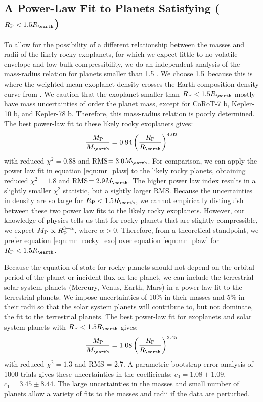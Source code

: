 \documentclass[iop]{emulateapj}
\begin{document}
\subsection{A Power-Law Fit to Planets Satisfying ($\rpl < 1.5 \rearth$)}
To allow for the possibility of a different relationship between the masses and radii of the likely rocky exoplanets, for which we expect little to no volatile envelope and low bulk compressibility, we do an independent analysis of the mass-radius relation for planets smaller than 1.5 \rearth.  We choose 1.5\rearth\ because this is where the weighted mean exoplanet density crosses the Earth-composition density curve from \citet[][see Figure \ref{fig:rm_4}]{Seager2007}.  We caution that the exoplanet smaller than $\rpl < 1.5 \rearth$ mostly have mass uncertainties of order the planet mass, except for CoRoT-7 b, Kepler-10 b, and Kepler-78 b.  Therefore, this mass-radius relation is poorly determined.  The best power-law fit to these likely rocky exoplanets gives:
\begin{equation}
\frac{\mpl}{\mearth} = 0.94 \left(\frac{\rpl}{\rearth}\right)^{4.02}
\label{eqn:mr_rocky_exo}
\end{equation}
with reduced $\chi^2 = 0.88$ and RMS$ = 3.0 \mearth$.  For comparison, we can apply the power law fit in equation \ref{eqn:mr_plaw} to the likely rocky planets, obtaining reduced $\chi^2 = 1.8$ and RMS$ = 2.9\mearth$.  The higher power law index results in a slightly smaller $\chi^2$ statistic, but a sightly larger RMS.  Because the uncertainties in density are so large for $\rpl < 1.5 \rearth$, we cannot empirically distinguish between these two power law fits to the likely rocky exoplanets.  However, our knowledge of physics tells us that for rocky planets that are slightly compressible, we expect $M_{\rm P} \propto R_{\rm P}^{3 + \alpha}$, where $\alpha > 0$.  Therefore, from a theoretical standpoint, we prefer equation \ref{eqn:mr_rocky_exo} over equation \ref{eqn:mr_plaw} for $\rpl < 1.5 \rearth$.

Because the equation of state for rocky planets should not depend on the orbital period of the planet or incident flux on the planet, we can include the terrestrial solar system planets (Mercury, Venus, Earth, Mars) in a power law fit to the terrestrial planets.  We impose uncertainties of 10\% in their masses and 5\% in their radii so that the solar system planets will contribute to, but not dominate, the fit to the terrestrial planets.  The best power-law fit for exoplanets and solar system planets with $\rpl < 1.5 \rearth$ gives:
\begin{equation}
\frac{\mpl}{\mearth} = 1.08 \left(\frac{\rpl}{\rearth}\right)^{3.45}
\label{eqn:mr_rocky}
\end{equation}
with reduced $\chi^2 = 1.3$ and RMS = 2.7\mearth.  A parametric bootstrap error analysis of 1000 trials gives these uncertainties in the coefficients: $c_0 =1.08 \pm 1.09$, $c_1 = 3.45\pm 8.44$.  The large uncertainties in the masses and small number of planets allow a variety of fits to the masses and radii if the data are perturbed.  
\end{document}
